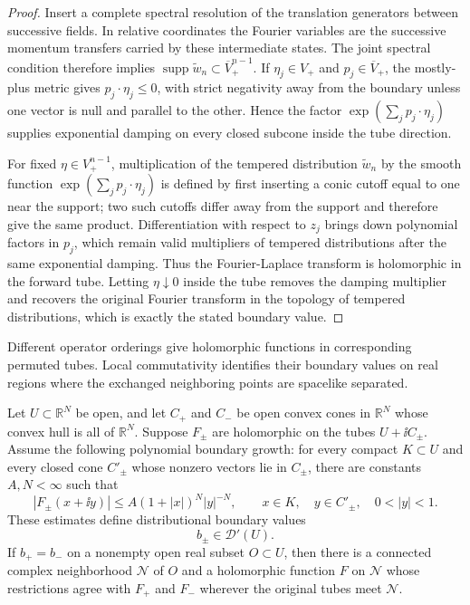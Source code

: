 \begin{proof}
Insert a complete spectral resolution of the translation generators between
successive fields.  In relative coordinates the Fourier variables are the
successive momentum transfers carried by these intermediate states.  The
joint spectral condition therefore implies
\(\operatorname{supp}\widetilde w_n\subset\overline V_+^{n-1}\).  If
\(\eta_j\in V_+\) and \(p_j\in\overline V_+\), the mostly-plus metric gives
\(p_j\cdot\eta_j\le0\), with strict negativity away from the boundary unless
one vector is null and parallel to the other.  Hence the factor
\(\exp(\sum_jp_j\cdot\eta_j)\) supplies exponential damping on every closed
subcone inside the tube direction.

For fixed \(\eta\in V_+^{n-1}\), multiplication of the tempered distribution
\(\widetilde w_n\) by the smooth function
\(\exp(\sum_jp_j\cdot\eta_j)\) is defined by first inserting a conic cutoff
equal to one near the support; two such cutoffs differ away from the support
and therefore give the same product.  Differentiation with respect to
\(z_j\) brings down polynomial factors in \(p_j\), which remain valid
multipliers of tempered distributions after the same exponential damping.
Thus the Fourier-Laplace transform is holomorphic in the forward tube.
Letting \(\eta\downarrow0\) inside the tube removes the damping multiplier and
recovers the original Fourier transform in the topology of tempered
distributions, which is exactly the stated boundary value.
\end{proof}

Different operator orderings give holomorphic functions in corresponding
permuted tubes.  Local commutativity identifies their boundary values on real
regions where the exchanged neighboring points are spacelike separated.

\begin{theorem}
\label{thm:distributional-edge-of-the-wedge}
Let \(U\subset\mathbb R^N\) be open, and let \(C_+\) and \(C_-\) be open
convex cones in \(\mathbb R^N\) whose convex hull is all of
\(\mathbb R^N\).  Suppose \(F_\pm\) are holomorphic on the tubes
\(U+\ii C_\pm\).  Assume the following polynomial boundary growth: for every
compact \(K\subset U\) and every closed cone \(C'_\pm\) whose nonzero vectors
lie in \(C_\pm\), there are constants \(A,N<\infty\) such that
\[
  |F_\pm(x+\ii y)|
  \le
  A(1+|x|)^N |y|^{-N},
  \qquad
  x\in K,\quad y\in C'_\pm,\quad 0<|y|<1.
\]
These estimates define distributional boundary values
\[
  b_\pm\in\mathcal D'(U).
\]
If \(b_+=b_-\) on a nonempty open real subset \(O\subset U\), then there is a
connected complex neighborhood \(\mathcal N\) of \(O\) and a holomorphic
function \(F\) on \(\mathcal N\) whose restrictions agree with \(F_+\) and
\(F_-\) wherever the original tubes meet \(\mathcal N\).
\end{theorem}

